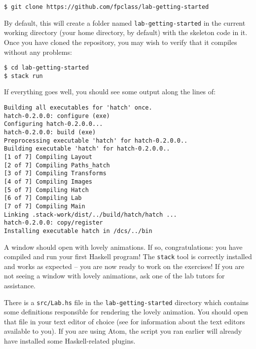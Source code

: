 \begin{verbatim}
$ git clone https://github.com/fpclass/lab-getting-started
\end{verbatim}
By default, this will create a folder named \texttt{\small lab-getting-started} in the current working directory (your home directory, by default) with the skeleton code in it. Once you have cloned the repository, you may wish to verify that it compiles without any problems:
\begin{verbatim}
$ cd lab-getting-started
$ stack run
\end{verbatim}
If everything goes well, you should see some output along the lines of:
\begin{verbatim}
Building all executables for 'hatch' once. 
hatch-0.2.0.0: configure (exe)
Configuring hatch-0.2.0.0...
hatch-0.2.0.0: build (exe)
Preprocessing executable 'hatch' for hatch-0.2.0.0..
Building executable 'hatch' for hatch-0.2.0.0..
[1 of 7] Compiling Layout           
[2 of 7] Compiling Paths_hatch 
[3 of 7] Compiling Transforms   
[4 of 7] Compiling Images   
[5 of 7] Compiling Hatch   
[6 of 7] Compiling Lab     
[7 of 7] Compiling Main  
Linking .stack-work/dist/../build/hatch/hatch ...
hatch-0.2.0.0: copy/register
Installing executable hatch in /dcs/../bin
\end{verbatim}
A window should open with lovely animations. If so, congratulations: you have compiled and run your first Haskell program! The \texttt{\small stack} tool is correctly installed and works as expected -- you are now ready to work on the exercises! If you are not seeing a window with lovely animations, ask one of the lab tutors for assistance.

\taskLine 

There is a \texttt{\small src/Lab.hs} file in the \texttt{\small lab-getting-started} directory which contains some definitions responsible for rendering the lovely animation. You should open that file in your text editor of choice (see  for information about the text editors available to you). If you are using Atom, the  script you ran earlier will already have installed some Haskell-related plugins.


